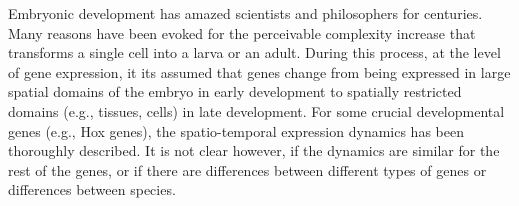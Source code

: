 
Embryonic development has amazed scientists and philosophers for centuries.
%
Many reasons have been evoked for the perceivable complexity increase that transforms a single cell into a larva or an adult.
%
%
During this process, at the level of gene expression, 
it its assumed that genes change from being expressed in large spatial domains of the embryo in early development to spatially restricted domains (e.g., tissues, cells) in late development.
%
For some crucial developmental genes (e.g., Hox genes), the spatio-temporal expression dynamics
has been thoroughly described.
It is not clear however, if the dynamics are similar for the rest of the genes,
or if there are differences between different types of genes or differences between species.

